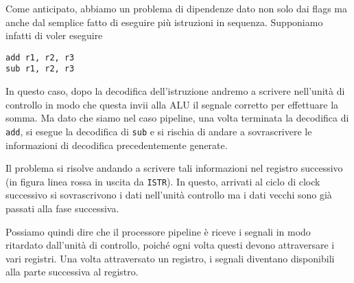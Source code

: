 Come anticipato, abbiamo un problema di dipendenze dato non solo dai flags ma anche dal semplice
fatto di eseguire più istruzioni in sequenza. Supponiamo infatti di voler eseguire
\begin{verbatim}
add r1, r2, r3
sub r1, r2, r3
\end{verbatim}
In questo caso, dopo la decodifica dell'istruzione andremo a scrivere nell'unità di controllo in
modo che questa invii alla ALU il segnale corretto per effettuare la somma. Ma dato che siamo nel
caso pipeline, una volta terminata la decodifica di \verb|add|, si esegue la decodifica di
\verb|sub| e si rischia di andare a sovrascrivere le informazioni di decodifica precedentemente
generate.

Il problema si risolve andando a scrivere tali informazioni nel registro successivo (in figura
linea rossa in uscita da \verb|ISTR|). In questo, arrivati al ciclo di clock successivo si
sovrascrivono i dati nell'unità controllo ma i dati vecchi sono già passati alla fase successiva.

Possiamo quindi dire che il processore pipeline è riceve i segnali in modo ritardato dall'unità di
controllo, poiché ogni volta questi devono attraversare i vari registri. Una volta attraversato un
registro, i segnali diventano disponibili alla parte successiva al registro.
